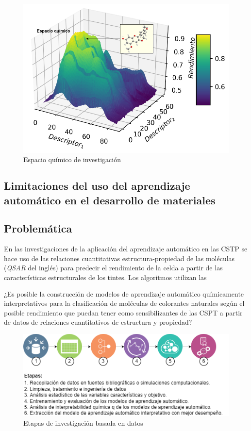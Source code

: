 \begin{figure}[h!]
    \begin{center}
        \includegraphics[scale=0.45]{img/espacioquimico.png}
    \end{center}
    \label{img:espacioquimico}
    \caption{Espacio químico de investigación}
\end{figure}










\subsection{Limitaciones del uso del aprendizaje automático en el desarrollo de materiales}

\subsection{Problemática}


En las investigaciones de la aplicación del aprendizaje automático en las CSTP se hace uso de las relaciones cuantitativas estructura-propiedad de las moléculas (\textit{QSAR} del inglés) para predecir el rendimiento de la celda a partir de las características estructurales de los tintes. Los algoritmos utilizan las 

¿Es posible la construcción de modelos de aprendizaje automático químicamente interpretativos para la clasificación de moléculas de colorantes naturales según el posible rendimiento que puedan tener como sensibilizantes de las CSPT a partir de datos de relaciones cuantitativos de estructura y propiedad?


\begin{figure}[h!]
    \begin{center}
        \includegraphics[scale=0.7]{img/etapas.png}
    \end{center}
    \label{img:etapas}
    \caption{Etapas de investigación basada en datos}
\end{figure}
